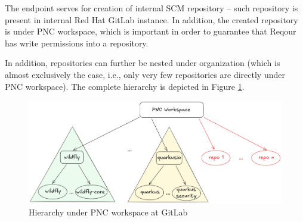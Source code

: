 \documentclass[../main.tex]{subfiles}
\begin{document}
The endpoint serves for creation of internal SCM repository – such repository is present in internal Red Hat GitLab instance. In addition, the created repository is under PNC workspace, which is important in order to guarantee that Reqour has write permissions into a repository.

In addition, repositories can further be nested under organization (which is almost exclusively the case, i.e., only very few repositories are directly under PNC workspace). The complete hierarchy is depicted in Figure \ref{fig:gitlab-hierarchy}.

\begin{figure}
  \begin{center}
    \includegraphics[width=\textwidth]{images/gitlab-hierarchy.png}
  \end{center}
  \caption{Hierarchy under PNC workspace at GitLab}
  \label{fig:gitlab-hierarchy}
\end{figure}
\end{document}
